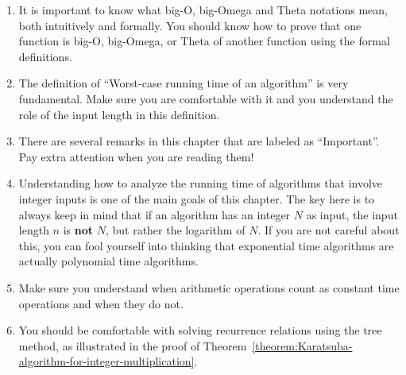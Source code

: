 \begin{gram}
\label{grm:time-complexity::know}
\begin{enumerate}
    \item It is important to know what big-O, big-Omega and Theta notations mean, both intuitively and formally. You should know how to prove that one function is big-O, big-Omega, or Theta of another function using the formal definitions.
    \item The definition of ``Worst-case running time of an algorithm'' is very fundamental. Make sure you are comfortable with it and you understand the role of the input length in this definition. 
    \item There are several remarks in this chapter that are labeled as ``Important''. Pay extra attention when you are reading them!
    \item Understanding how to analyze the running time of algorithms that involve integer inputs is one of the main goals of this chapter. The key here is to always keep in mind that if an algorithm has an integer $N$ as input, the input length $n$ is \textbf{not} $N$, but rather the logarithm of $N$. If you are not careful about this, you can fool yourself into thinking that exponential time algorithms are actually polynomial time algorithms.
    \item Make sure you understand when arithmetic operations count as constant time operations and when they do not.
    \item You should be comfortable with solving recurrence relations using the tree method, as illustrated in the proof of Theorem~\ref{theorem:Karatsuba-algorithm-for-integer-multiplication}.
\end{enumerate}

\end{gram}


